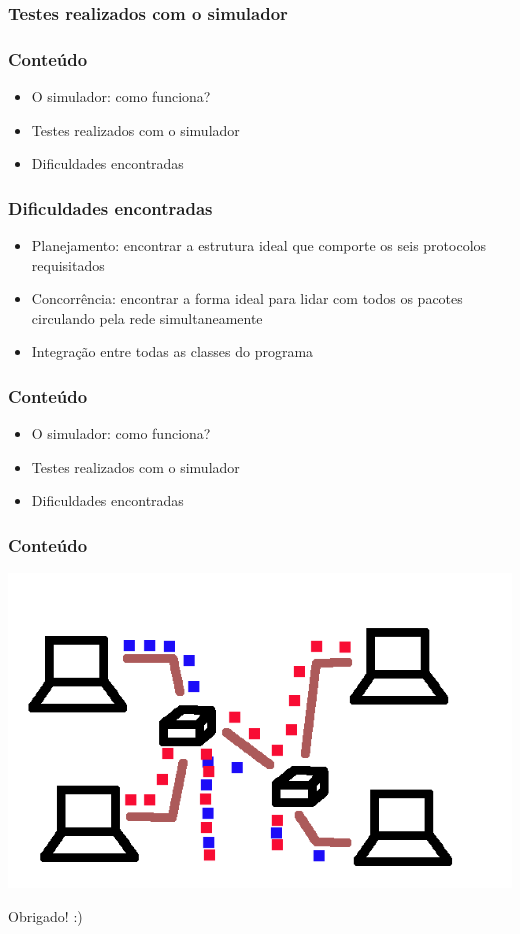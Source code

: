 \documentclass{beamer}
\begin{document}
\begin{frame}
	\frametitle{Testes realizados com o simulador}
\end{frame}

\begin{frame}
	\frametitle{Conteúdo}
	\begin{itemize}
		\item \textcolor{covered}{O simulador: como funciona?}
		\item \textcolor{covered}{Testes realizados com o simulador}
		\item Dificuldades encontradas
	\end{itemize}
\end{frame}

\begin{frame}
	\frametitle{Dificuldades encontradas}
	\begin{itemize}
		\item Planejamento: encontrar a estrutura ideal que comporte os seis protocolos requisitados
		\item Concorrência: encontrar a forma ideal para lidar com todos os pacotes circulando pela rede simultaneamente
		\item Integração entre todas as classes do programa
	\end{itemize}
\end{frame}

\begin{frame}
	\frametitle{Conteúdo}
	\begin{itemize}
		\item \textcolor{covered}{O simulador: como funciona?}
		\item \textcolor{covered}{Testes realizados com o simulador}
		\item \textcolor{covered}{Dificuldades encontradas}
	\end{itemize}
\end{frame}

\begin{frame}
	\frametitle{Conteúdo}
	\begin{center}
	\includegraphics[scale=0.3]{simulator2.png}
	\end{center}
	\begin{center}
	Obrigado! :)
	\end{center}

\end{frame}
\end{document}
